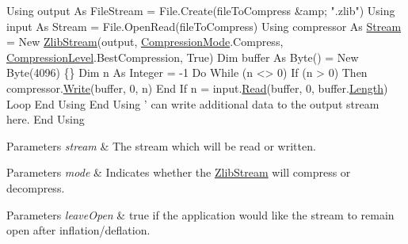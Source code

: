 \begin{DoxyCode}
Using output As FileStream = File.Create(fileToCompress &amp; \textcolor{stringliteral}{".zlib"})
    Using input As Stream = File.OpenRead(fileToCompress)
        Using compressor As \mbox{\hyperlink{namespace_super_tiled2_unity_1_1_ionic_1_1_zip_a9ced5352c56e7e0fceff15b534073c83aeae835e83c0494a376229f254f7d3392}{Stream}} = New \mbox{\hyperlink{class_super_tiled2_unity_1_1_ionic_1_1_zlib_1_1_zlib_stream_a626c8b9a6ae8fffc521a24efc94f6f39}{ZlibStream}}(output, 
      \mbox{\hyperlink{namespace_super_tiled2_unity_1_1_ionic_1_1_zlib_ad5b7635d92497e1c905e5de82eb1c6b1}{CompressionMode}}.Compress, \mbox{\hyperlink{namespace_super_tiled2_unity_1_1_ionic_1_1_zlib_a20f6771804996c363f454ad9765cd7db}{CompressionLevel}}.BestCompression, True)
            Dim buffer As Byte() = New Byte(4096) \{\}
            Dim n As Integer = -1
            Do While (n <> 0)
                If (n > 0) Then
                    compressor.\mbox{\hyperlink{class_super_tiled2_unity_1_1_ionic_1_1_zlib_1_1_zlib_stream_a042abef8f9aa0d0043e6081d9de7dea7}{Write}}(buffer, 0, n)
                End If
                n = input.\mbox{\hyperlink{class_super_tiled2_unity_1_1_ionic_1_1_zlib_1_1_zlib_stream_a0987720c2d2c6219e1f1cbd9ae8ee818}{Read}}(buffer, 0, buffer.\mbox{\hyperlink{class_super_tiled2_unity_1_1_ionic_1_1_zlib_1_1_zlib_stream_a54ad4fbbd65e5e04fc2b714067f77fba}{Length}})
            Loop
        End Using
    End Using
    ' can write additional data to the output stream here.
End Using
\end{DoxyCode}
 


\begin{DoxyParams}{Parameters}
{\em stream} & The stream which will be read or written.\\
\hline
\end{DoxyParams}



\begin{DoxyParams}{Parameters}
{\em mode} & Indicates whether the \mbox{\hyperlink{class_super_tiled2_unity_1_1_ionic_1_1_zlib_1_1_zlib_stream}{Zlib\+Stream}} will compress or decompress.\\
\hline
\end{DoxyParams}



\begin{DoxyParams}{Parameters}
{\em leave\+Open} & true if the application would like the stream to remain open after inflation/deflation. \\
\hline
\end{DoxyParams}



